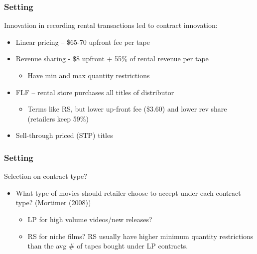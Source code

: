 
\begin{frame}
\frametitle{Setting}

Innovation in recording rental transactions led to contract innovation:

\begin{itemize}
\item Linear pricing -- \$65-70 upfront fee per tape

\item Revenue sharing - \$8 upfront + 55\% of rental revenue per tape

\begin{itemize}
\item Have min and max quantity restrictions
\end{itemize}

\item FLF -- rental store purchases all titles of distributor

\begin{itemize}
\item Terms like RS, but lower up-front fee (\$3.60) and lower rev share
(retailers keep 59\%)
\end{itemize}

\item Sell-through priced (STP) titles

\end{itemize}
\end{frame}


\begin{frame}
\frametitle{Setting}

Selection on contract type?

\begin{itemize}
\item What type of movies should retailer choose to accept under each
contract type? (Mortimer (2008))

\begin{itemize}
\item LP for high volume videos/new releases?

\item RS for niche films? RS usually have higher minimum quantity
restrictions than the avg \# of tapes bought under LP contracts.
\end{itemize}

\end{itemize}
\end{frame}

